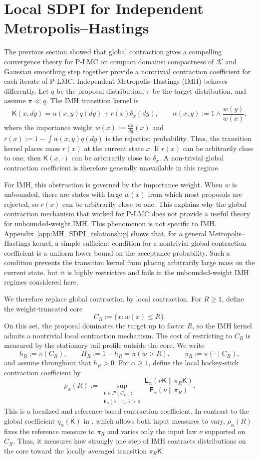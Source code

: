 \documentclass[10pt, journal]{IEEEtran}
\makeatletter
\def\eqref#1{equation~\ref{#1}}
\renewcommand{\eqref}[1]{\textup{\tagform@{\ref{#1}}}}
\newcommand{\sK}{\mathsf{K}}
\makeatother
\begin{document}
\section{Local SDPI for Independent Metropolis--Hastings} \label{sec:mixingtime_MH}

The previous section showed that global contraction gives a compelling convergence theory for P-LMC on compact domains: compactness of $\mathcal K$ and Gaussian smoothing step together provide a nontrivial contraction coefficient for each iterate of P-LMC. Independent Metropolis--Hastings (IMH) behaves differently. Let $q$ be the proposal distribution, $\pi$ be the target distribution, and assume $\pi\ll q$. The IMH transition kernel is $$\sK(x,dy)=\alpha(x,y)q(dy)+r(x)\delta_x(dy),\qquad \alpha(x,y):=1\wedge\frac{w(y)}{w(x)},$$ where  the importance weight $w(x):=\frac{d\pi}{dq}(x)$ and $r(x):=1-\int \alpha(x,y)q(dy)$ is the rejection probability. Thus, the transition kernel places mass $r(x)$ at the current state $x$. If $r(x)$ can be arbitrarily close to one, then $\sK(x,\cdot)$ can be arbitrarily close to $\delta_x$. A non-trivial global contraction coefficient is therefore generally unavailable in this regime.

For IMH, this obstruction is governed by the importance weight. When $w$ is unbounded, there are states with large $w(x)$ from which most proposals are rejected, so $r(x)$ can be arbitrarily close to one. This explains why the global contraction mechanism that worked for P-LMC does not provide a useful theory for unbounded-weight IMH. This phenomenon is not specific to IMH. Appendix~\ref{app:MH_SDPI_relationship} shows that, for a general Metropolis--Hastings kernel, a simple sufficient condition for a nontrivial global contraction coefficient is a uniform lower bound on the acceptance probability. Such a condition prevents the transition kernel from placing arbitrarily large mass on the current state, but it is highly restrictive and fails in the unbounded-weight IMH regimes considered here.

We therefore replace global contraction by local contraction. For $R\ge1$, define the weight-truncated core $$C_R:=\{x:w(x)\le R\}.$$ On this set, the proposal dominates the target up to factor $R$, so the IMH kernel admits a nontrivial local contraction mechanism. The cost of restricting to $C_R$ is measured by the stationary tail profile outside the core. We write $$h_R:=\pi(C_R),\qquad H_R:=1-h_R=\pi(w>R),\qquad \pi_R:=\pi(\cdot\mid C_R),$$ and assume throughout that $h_R>0$.
For $\alpha\ge1$, define the local hockey-stick contraction coefficient by $$\rho_\alpha(R):=\sup_{\substack{\nu\in \mathcal P(C_R):\\ \mathsf E_\alpha(\nu\|\pi_R)>0}}\frac{\mathsf E_\alpha(\nu\sK\|\pi_R\sK)}{\mathsf E_\alpha(\nu\|\pi_R)}.$$ This is a localized and reference-based contraction coefficient. In contrast to the global coefficient $\eta_\alpha(\sK)$ in \eqref{eq:SDPI_gamma}, which allows both input measures to vary, $\rho_\alpha(R)$ fixes the reference measure to $\pi_R$ and varies only the input law $\nu$ supported on $C_R$. Thus, it measures how strongly one step of IMH contracts distributions on the core toward the locally averaged transition $\pi_R\sK$.
\end{document}

